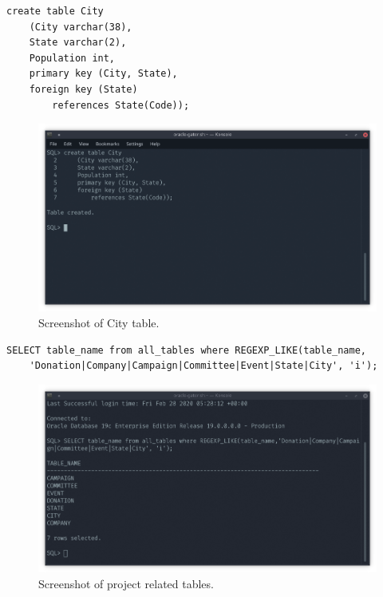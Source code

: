 \documentclass[12pt]{article}
\begin{document}
\begin{verbatim}
create table City
    (City varchar(38),
    State varchar(2),
    Population int,
    primary key (City, State),
    foreign key (State) 
        references State(Code));
\end{verbatim}
    \begin{figure}[H]
        \begin{center}
        \includegraphics[scale=.40]{city}
        \caption{Screenshot of City table.}
        \label{fig:city}
        \end{center}
    \end{figure}
    \begin{verbatim}
SELECT table_name from all_tables where REGEXP_LIKE(table_name,
    'Donation|Company|Campaign|Committee|Event|State|City', 'i');
    \end{verbatim}
        \begin{figure}[H]
        \begin{center}
        \includegraphics[scale=.40]{tables}
        \caption{Screenshot of project related tables.}
        \label{fig:tables}
        \end{center}
    \end{figure}
\end{document}
